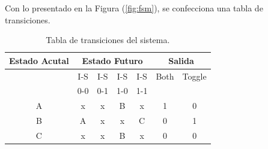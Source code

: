 Con lo presentado en la Figura (\ref{fig:fsm}), se confecciona una tabla de transiciones.
\begin{table}[H]
\centering
\begin{tabular}{|c|cccc|cc|}
\hline
\textbf{Estado Acutal} & \multicolumn{4}{c|}{\textbf{Estado Futuro}} & \multicolumn{2}{c|}{\textbf{Salida}} \\ \hline
                       & I-S       & I-S       & I-S      & I-S               & Both        & Toggle        \\
                       & 0-0       & 0-1       & 1-0      & 1-1                  &            &           \\ \hline
A                      & x         & x         & B        & x                   & 1          & 0         \\ \cline{1-1}
B                      & A         & x         & x        & C                  & 0          & 1         \\ \cline{1-1}
C                      & x         & x         & B        & x                  & 0        & 0  \\ \hline
\end{tabular}
\caption{Tabla de transiciones del sistema.}
\label{tab:estados}
\end{table}

